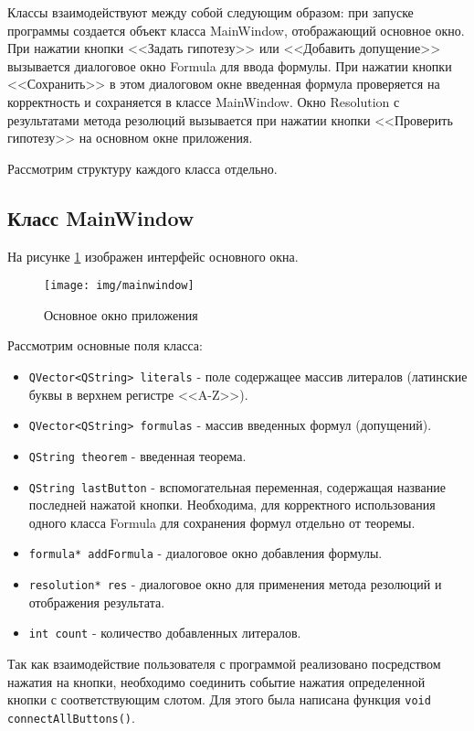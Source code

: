 \documentclass[12pt, a4paper]{article}
\begin{document}
	 \par Классы взаимодействуют между собой следующим образом: при запуске программы создается объект класса MainWindow, отображающий основное окно. При нажатии кнопки <<Задать гипотезу>> или <<Добавить допущение>> вызывается диалоговое окно Formula для ввода формулы. При нажатии кнопки <<Сохранить>> в этом диалоговом окне введенная формула проверяется на корректность и сохраняется в классе MainWindow. Окно Resolution с результатами метода резолюций вызывается при нажатии кнопки <<Проверить гипотезу>> на основном окне приложения.
	 \par Рассмотрим структуру каждого класса отдельно.
	 \newpage
	 \begin{center}
	 	\subsection{Класс MainWindow}
	 \end{center} 
	 На рисунке \ref{fig:mainwindow} изображен интерфейс основного окна.
	 \begin{figure}[h!]
	 	\centering
	 	\texttt{[image: img/mainwindow]}
	 	\caption{Основное окно приложения}
	 	\label{fig:mainwindow}
	 \end{figure}
	 \par Рассмотрим основные поля класса:
	 \begin{itemize}
	 	\item \texttt{QVector<QString> literals} - поле содержащее массив литералов (латинские буквы в верхнем регистре <<A-Z>>).
	 	\item \texttt{QVector<QString> formulas} - массив введенных формул (допущений).
	 	\item \texttt{QString theorem} - введенная теорема.
	 	\item \texttt{QString lastButton} - вспомогательная переменная, содержащая название последней нажатой кнопки. Необходима, для корректного использования одного класса Formula для сохранения формул отдельно от теоремы.
	 	\item \texttt{formula* addFormula} - диалоговое окно добавления формулы.
	 	\item \texttt{resolution* res} - диалоговое окно для применения метода резолюций и отображения результата.
	 	\item \texttt{int count} - количество добавленных литералов.
	 \end{itemize} 
	 \par Так как взаимодействие пользователя с программой реализовано посредством нажатия на кнопки, необходимо соединить событие нажатия определенной кнопки с соответствующим слотом. Для этого была написана функция \texttt{void connectAllButtons()}.
\end{document}
